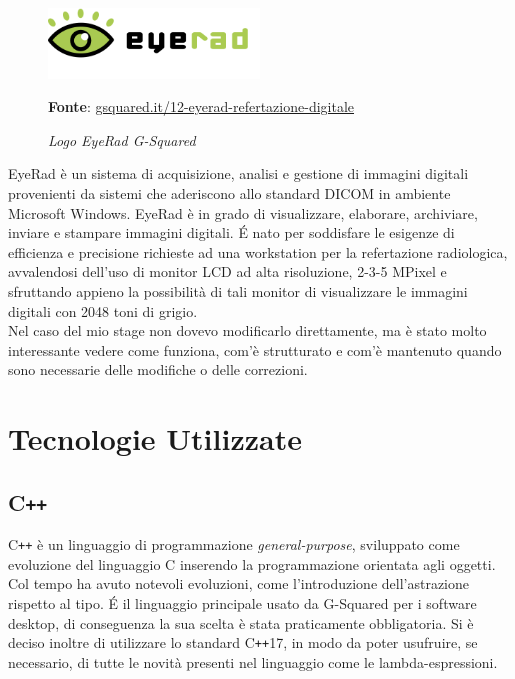 \begin{figure}[h]
    \centering
    \includegraphics[width=0.5\textwidth]{immagini/logo-software-eyerad.png}
    \caption{\textit{Logo EyeRad G-Squared}}
    \textbf{Fonte}: \href{https://www.gsquared.it/it/pacs-ris-web-gateway-dicom-ihe-2/software-immagini-medicali/12-eyerad-refertazione-digitale}{gsquared.it/12-eyerad-refertazione-digitale}
    \label{fig: Logo software EyeRad G-Squared}
\end{figure}

EyeRad è un sistema di acquisizione, analisi e gestione di immagini digitali provenienti da sistemi che aderiscono allo standard DICOM in ambiente Microsoft Windows.
EyeRad è in grado di visualizzare, elaborare, archiviare, inviare e stampare immagini digitali.
\'E nato per soddisfare le esigenze di efficienza e precisione richieste ad una workstation per la refertazione radiologica, avvalendosi dell'uso di monitor LCD ad alta risoluzione, 2-3-5 MPixel e sfruttando appieno la possibilità di tali monitor di visualizzare le immagini digitali con 2048 toni di grigio.
\\
Nel caso del mio stage non dovevo modificarlo direttamente, ma è stato molto interessante vedere come funziona, com'è strutturato e com'è mantenuto quando sono necessarie delle modifiche o delle correzioni.

\section{Tecnologie Utilizzate}
\subsection{C\texttt{++}}\label{sec:C++}
C\texttt{++} è un linguaggio di programmazione \emph{general-purpose}, sviluppato come evoluzione del linguaggio C inserendo la programmazione orientata agli oggetti. Col tempo ha avuto notevoli evoluzioni, come l'introduzione dell'astrazione rispetto al tipo. \'E il linguaggio principale usato da G-Squared per i software desktop, di conseguenza la sua scelta è stata praticamente obbligatoria. Si è deciso inoltre di utilizzare lo standard C\texttt{++}17, in modo da poter usufruire, se necessario, di tutte le novità presenti nel linguaggio come le lambda-espressioni.

